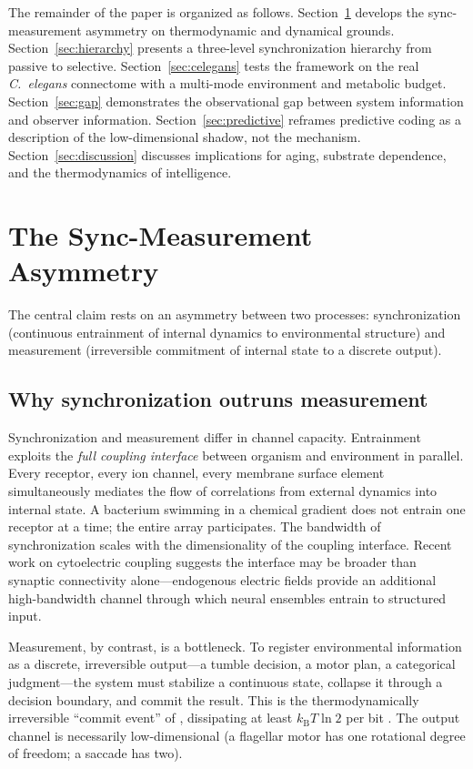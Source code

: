 \documentclass[12pt]{article}
\newcommand{\kB}{k_{\mathrm{B}}}
\begin{document}
The remainder of the paper is organized as follows. Section~\ref{sec:asymmetry} develops the sync-measurement asymmetry on thermodynamic and dynamical grounds. Section~\ref{sec:hierarchy} presents a three-level synchronization hierarchy from passive to selective. Section~\ref{sec:celegans} tests the framework on the real \textit{C.~elegans} connectome with a multi-mode environment and metabolic budget. Section~\ref{sec:gap} demonstrates the observational gap between system information and observer information. Section~\ref{sec:predictive} reframes predictive coding as a description of the low-dimensional shadow, not the mechanism. Section~\ref{sec:discussion} discusses implications for aging, substrate dependence, and the thermodynamics of intelligence.


\section{The Sync-Measurement Asymmetry}
\label{sec:asymmetry}

The central claim rests on an asymmetry between two processes: synchronization (continuous entrainment of internal dynamics to environmental structure) and measurement (irreversible commitment of internal state to a discrete output).

\subsection{Why synchronization outruns measurement}
\label{sec:sync_outruns}

Synchronization and measurement differ in channel capacity. Entrainment exploits the \textit{full coupling interface} between organism and environment in parallel. Every receptor, every ion channel, every membrane surface element simultaneously mediates the flow of correlations from external dynamics into internal state. A bacterium swimming in a chemical gradient does not entrain one receptor at a time; the entire array participates. The bandwidth of synchronization scales with the dimensionality of the coupling interface. Recent work on cytoelectric coupling \cite{pinotsis2023} suggests the interface may be broader than synaptic connectivity alone---endogenous electric fields provide an additional high-bandwidth channel through which neural ensembles entrain to structured input.

Measurement, by contrast, is a bottleneck. To register environmental information as a discrete, irreversible output---a tumble decision, a motor plan, a categorical judgment---the system must stabilize a continuous state, collapse it through a decision boundary, and commit the result. This is the thermodynamically irreversible ``commit event'' of \cite{todd2026coherence}, dissipating at least $\kB T \ln 2$ per bit \cite{todd2025demon}. The output channel is necessarily low-dimensional (a flagellar motor has one rotational degree of freedom; a saccade has two).
\end{document}
